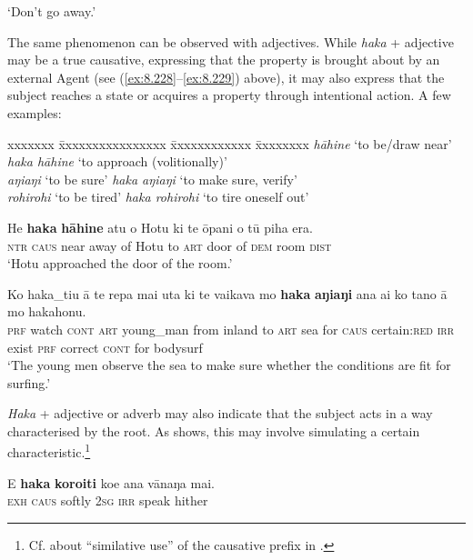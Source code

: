 \glt
‘Don’t go away.’ \textstyleExampleref{[R482.045]} 
\z

The same phenomenon can be observed with adjectives. While \textit{haka} + adjective may be a true causative, expressing that the property is brought about by an external Agent (see (\ref{ex:8.228}–\ref{ex:8.229}) above), it may also express that the subject reaches a state or acquires a property through intentional action. A few examples:

\ea\label{ex:8.246a}
\begin{tabbing}
xxxxxxx \= xxxxxxxxxxxxxxxx \= xxxxxxxxxxxx \= xxxxxxxx \kill
\textit{hāhine} \> ‘to be/draw near’ \> \textit{haka hāhine} \> ‘to approach (volitionally)’\\
\textit{aŋiaŋi} \> ‘to be sure’ \> \textit{haka aŋiaŋi} \> ‘to make sure, verify’\\
\textit{rohirohi} \> ‘to be tired’ \> \textit{haka rohirohi} \> ‘to tire oneself out’
\end{tabbing}
\z

\ea\label{ex:8.247}
\gll He \textbf{haka} \textbf{hāhine} atu o Hotu ki te {\ꞌ}ōpani o tū piha era. \\
\textsc{ntr} \textsc{caus} near away of Hotu to \textsc{art} door of \textsc{dem} room \textsc{dist} \\

\glt 
‘Hotu approached the door of the room.’ \textstyleExampleref{[R301.121]} 
\z

\ea\label{ex:8.248}
\gll Ko haka\_tiu {\ꞌ}ā te repa mai {\ꞌ}uta ki te vaikava  mo \textbf{haka} \textbf{aŋiaŋi} ana ai ko tano {\ꞌ}ā mo hakahonu.\\
\textsc{prf} watch \textsc{cont} \textsc{art} young\_man from inland to \textsc{art} sea  for \textsc{caus} certain:\textsc{red} \textsc{irr} exist \textsc{prf} correct \textsc{cont} for bodysurf\\

\glt 
‘The young men observe the sea to make sure whether the conditions are fit for surfing.’ \textstyleExampleref{[R431.001]} 
\z

\textit{Haka} + adjective or adverb may also indicate that the subject acts in a way characterised by the root. As  shows, this may involve simulating a certain characteristic.\footnote{\label{fn:457}Cf. \citet[14]{Moyle2011} about “similative use” of the causative prefix in .}

\ea\label{ex:8.249}
\gll E \textbf{haka} \textbf{koro{\ꞌ}iti} koe ana vānaŋa mai. \\
\textsc{exh} \textsc{caus} softly \textsc{2sg} \textsc{irr} speak hither \\

